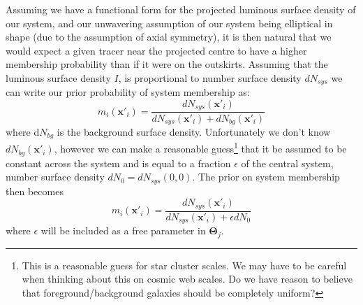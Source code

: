 Assuming we have a functional form for the projected luminous surface density of our system, and our unwavering assumption of our system being elliptical in shape (due to the assumption of axial symmetry), it is then natural that we would expect a given tracer near the projected centre to have a higher membership probability than if it were on the outskirts. Assuming that the luminous surface density $I$, is proportional to number surface density $dN_{sys}$ we can write our prior probability of system membership as:
\begin{equation}
m_{i}(\boldsymbol{x}'_{i}) = \frac{dN_{sys}(\boldsymbol{x}'_{i})}{dN_{sys}(\boldsymbol{x}'_{i}) + dN_{bg}(\boldsymbol{x}'_{i})}
\end{equation}
where d$N_{bg}$ is the background surface density. Unfortunately we don't know $dN_{bg}(\boldsymbol{x}'_{i})$, however we can make a reasonable guess\footnote{This is a reasonable guess for star cluster scales. We may have to be careful when thinking about this on cosmic web scales. Do we have reason to believe that foreground/background galaxies should be completely uniform?} that it be assumed to be constant across the system and is equal to a fraction $\epsilon$ of the central system, number surface density $dN_{0} = dN_{sys}(0,0)$. The prior on system membership then becomes
\begin{equation}
m_{i}(\boldsymbol{x}'_{i}) = \frac{dN_{sys}(\boldsymbol{x}'_{i})}{dN_{sys}(\boldsymbol{x}'_{i}) + \epsilon dN_{0}}
\end{equation}
where $\epsilon$ will be included as a free parameter in $\boldsymbol{\Theta}_{j}$.

